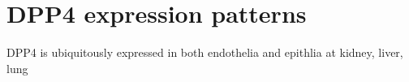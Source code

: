 \section{DPP4 expression patterns}
DPP4 is ubiquitously expressed in both endothelia and epithlia at kidney, liver, lung